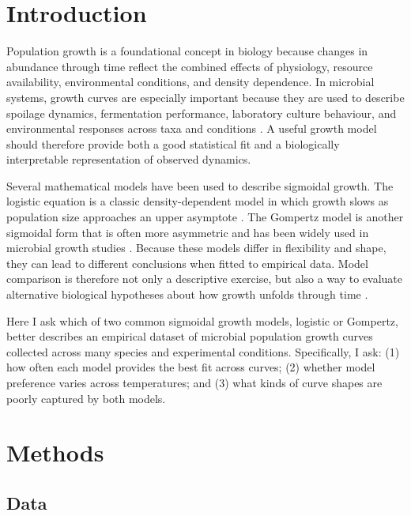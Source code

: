 \documentclass[11pt]{article}
\begin{document}
\newpage
\linenumbers

\section{Introduction}

  Population growth is a foundational concept in biology because changes in abundance through time reflect the combined effects of physiology, resource availability, environmental conditions, and density dependence. In microbial systems, growth curves are especially important because they are used to describe spoilage dynamics, fermentation performance, laboratory culture behaviour, and environmental responses across taxa and conditions \citep{Zwietering1990}. A useful growth model should therefore provide both a good statistical fit and a biologically interpretable representation of observed dynamics.

Several mathematical models have been used to describe sigmoidal growth. The logistic equation is a classic density-dependent model in which growth slows as population size approaches an upper asymptote \citep{Verhulst1838}. The Gompertz model is another sigmoidal form that is often more asymmetric and has been widely used in microbial growth studies \citep{Gompertz1825,Zwietering1990}. Because these models differ in flexibility and shape, they can lead to different conclusions when fitted to empirical data. Model comparison is therefore not only a descriptive exercise, but also a way to evaluate alternative biological hypotheses about how growth unfolds through time \citep{JohnsonOmland2004}.

Here I ask which of two common sigmoidal growth models, logistic or Gompertz, better describes an empirical dataset of microbial population growth curves collected across many species and experimental conditions. Specifically, I ask: (1) how often each model provides the best fit across curves; (2) whether model preference varies across temperatures; and (3) what kinds of curve shapes are poorly captured by both models.

\section{Methods}

\subsection{Data}
\end{document}
